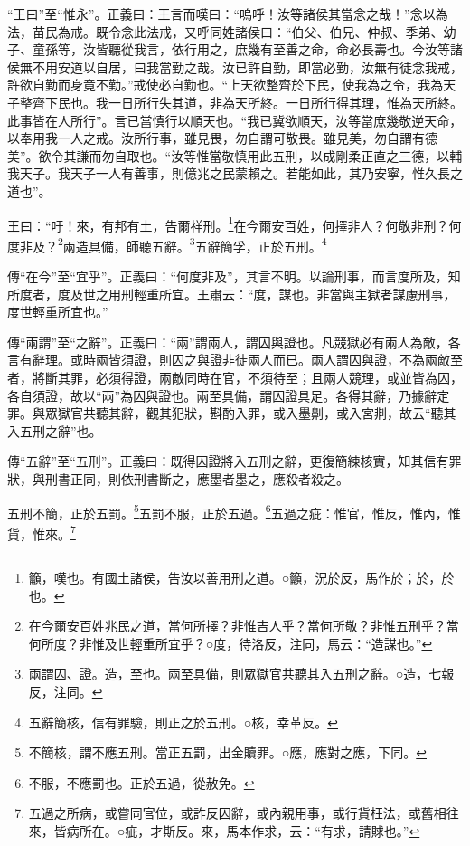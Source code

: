 {\noindent\shu{}\fzkt “王曰”至“惟永”。正義曰：王言而嘆曰：“嗚呼！汝等諸侯其當念之哉！”念以為法，苗民為戒。既令念此法戒，又呼同姓諸侯曰：“伯父、伯兄、仲叔、季弟、幼子、童孫等，汝皆聽從我言，依行用之，庶幾有至善之命，命必長壽也。今汝等諸侯無不用安道以自居，曰我當勤之哉。汝已許自勤，即當必勤，汝無有徒念我戒，許欲自勤而身竟不勤。”戒使必自勤也。“上天欲整齊於下民，使我為之令，我為天子整齊下民也。我一日所行失其道，非為天所終。一日所行得其理，惟為天所終。此事皆在人所行”。言已當慎行以順天也。“我已冀欲順天，汝等當庶幾敬逆天命，以奉用我一人之戒。汝所行事，雖見畏，勿自謂可敬畏。雖見美，勿自謂有德美”。欲令其謙而勿自取也。“汝等惟當敬慎用此五刑，以成剛柔正直之三德，以輔我天子。我天子一人有善事，則億兆之民蒙賴之。若能如此，其乃安寧，惟久長之道也”。 \par}

王曰：“吁！來，有邦有土，告爾祥刑。\footnote{籲，嘆也。有國土諸侯，告汝以善用刑之道。○籲，況於反，馬作於；於，於也。}在今爾安百姓，何擇非人？何敬非刑？何度非及？\footnote{在今爾安百姓兆民之道，當何所擇？非惟吉人乎？當何所敬？非惟五刑乎？當何所度？非惟及世輕重所宜乎？○度，待洛反，注同，馬云：“造謀也。”}兩造具備，師聽五辭。\footnote{兩謂囚、證。造，至也。兩至具備，則眾獄官共聽其入五刑之辭。○造，七報反，注同。}五辭簡孚，正於五刑。\footnote{五辭簡核，信有罪驗，則正之於五刑。○核，幸革反。}


{\noindent\zhuan{}\fzbyks 傳“在今”至“宜乎”。正義曰：“何度非及”，其言不明。以論刑事，而言度所及，知所度者，度及世之用刑輕重所宜。王肅云：“度，謀也。非當與主獄者謀慮刑事，度世輕重所宜也。” \par}

{\noindent\zhuan{}\fzbyks 傳“兩謂”至“之辭”。正義曰：“兩”謂兩人，謂囚與證也。凡競獄必有兩人為敵，各言有辭理。或時兩皆須證，則囚之與證非徒兩人而已。兩人謂囚與證，不為兩敵至者，將斷其罪，必須得證，兩敵同時在官，不須待至；且兩人競理，或並皆為囚，各自須證，故以“兩”為囚與證也。兩至具備，謂囚證具足。各得其辭，乃據辭定罪。與眾獄官共聽其辭，觀其犯狀，斟酌入罪，或入墨劓，或入宮剕，故云“聽其入五刑之辭”也。 \par}

{\noindent\zhuan{}\fzbyks 傳“五辭”至“五刑”。正義曰：既得囚證將入五刑之辭，更復簡練核實，知其信有罪狀，與刑書正同，則依刑書斷之，應墨者墨之，應殺者殺之。 \par}

五刑不簡，正於五罰。\footnote{不簡核，謂不應五刑。當正五罰，出金贖罪。○應，應對之應，下同。}五罰不服，正於五過。\footnote{不服，不應罰也。正於五過，從赦免。}五過之疵：惟官，惟反，惟內，惟貨，惟來。\footnote{五過之所病，或嘗同官位，或詐反囚辭，或內親用事，或行貨枉法，或舊相往來，皆病所在。○疵，才斯反。來，馬本作求，云：“有求，請賕也。”}



